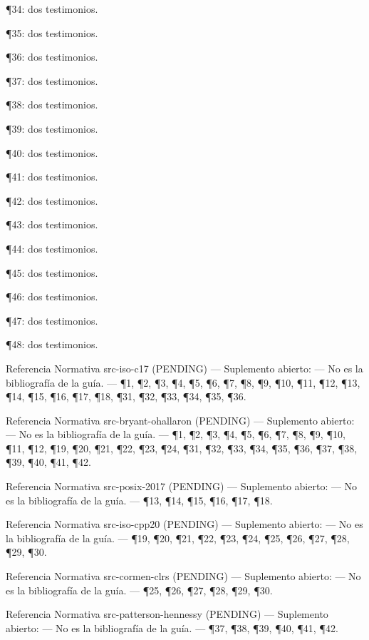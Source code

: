 \documentclass{book}
\begin{document}
\noindent ¶34: dos testimonios.

\noindent ¶35: dos testimonios.

\noindent ¶36: dos testimonios.

\noindent ¶37: dos testimonios.

\noindent ¶38: dos testimonios.

\noindent ¶39: dos testimonios.

\noindent ¶40: dos testimonios.

\noindent ¶41: dos testimonios.

\noindent ¶42: dos testimonios.

\noindent ¶43: dos testimonios.

\noindent ¶44: dos testimonios.

\noindent ¶45: dos testimonios.

\noindent ¶46: dos testimonios.

\noindent ¶47: dos testimonios.

\noindent ¶48: dos testimonios.

\medskip

\noindent Referencia Normativa src-iso-c17 (PENDING) --- Suplemento abierto: --- No es la bibliografía de la guía. --- \P1, \P2, \P3, \P4, \P5, \P6, \P7, \P8, \P9, \P10, \P11, \P12, \P13, \P14, \P15, \P16, \P17, \P18, \P31, \P32, \P33, \P34, \P35, \P36.

\noindent Referencia Normativa src-bryant-ohallaron (PENDING) --- Suplemento abierto: --- No es la bibliografía de la guía. --- \P1, \P2, \P3, \P4, \P5, \P6, \P7, \P8, \P9, \P10, \P11, \P12, \P19, \P20, \P21, \P22, \P23, \P24, \P31, \P32, \P33, \P34, \P35, \P36, \P37, \P38, \P39, \P40, \P41, \P42.

\noindent Referencia Normativa src-posix-2017 (PENDING) --- Suplemento abierto: --- No es la bibliografía de la guía. --- \P13, \P14, \P15, \P16, \P17, \P18.

\noindent Referencia Normativa src-iso-cpp20 (PENDING) --- Suplemento abierto: --- No es la bibliografía de la guía. --- \P19, \P20, \P21, \P22, \P23, \P24, \P25, \P26, \P27, \P28, \P29, \P30.

\noindent Referencia Normativa src-cormen-clrs (PENDING) --- Suplemento abierto: --- No es la bibliografía de la guía. --- \P25, \P26, \P27, \P28, \P29, \P30.

\noindent Referencia Normativa src-patterson-hennessy (PENDING) --- Suplemento abierto: --- No es la bibliografía de la guía. --- \P37, \P38, \P39, \P40, \P41, \P42.
\end{document}
